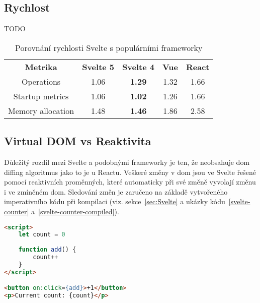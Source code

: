 \subsection{Rychlost}

TODO


\begin{table}[ht]
    \begin{tabular}{c|c|c|c|c}
        \bfseries Metrika & \bfseries{Svelte 5} & \bfseries{Svelte 4} & \bfseries{Vue} & \bfseries{React} \\\Midrule{}
        Operations        & 1.06                & \textbf{1.29}       & 1.32           & 1.66             \\
        Startup metrics   & 1.06                & \textbf{1.02}       & 1.26           & 1.66             \\
        Memory allocation & 1.48                & \textbf{1.46}       & 1.86           & 2.58
    \end{tabular}
    \caption{Porovnání rychlosti Svelte s populárními frameworky}
    \label{tab:foobar}
\end{table}

\clearpage

\subsection{Virtual DOM vs Reaktivita}

Důležitý rozdíl mezi Svelte a podobnými frameworky je ten, že neobsahuje \gls{dom} diffing algoritmus jako to je u Reactu.
Veškeré změny v \gls{dom} jsou ve Svelte řešené pomocí reaktivních proměnných, které automaticky při své změně vyvolají změnu i ve zmíněném \gls{dom}.
Sledování změn je zaručeno na základě vytvořeného imperativního kódu při kompilaci (viz. sekce~\ref{sec:Svelte} a ukázky kódu~\ref{svelte-counter} a~\ref{svelte-counter-compiled}).

\begin{lstlisting}[caption={Počítadlo ve Svelte 4}, label={svelte-counter}, language=html]
<script>
	let count = 0
	
	function add() {
		count++
	}
</script>

<button on:click={add}>+1</button>
<p>Current count: {count}</p>
\end{lstlisting}

